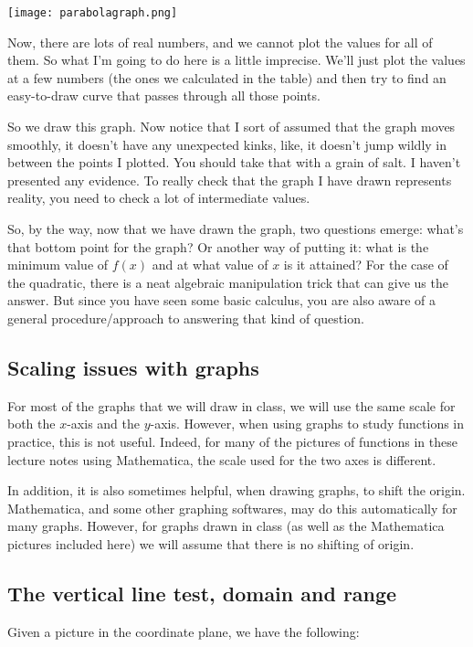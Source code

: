 \documentclass{amsart}
\begin{document}
\texttt{[image: parabolagraph.png]}

Now, there are lots of real numbers, and we cannot plot the values for
all of them. So what I'm going to do here is a little imprecise. We'll
just plot the values at a few numbers (the ones we calculated in the
table) and then try to find an easy-to-draw curve that passes through
all those points. 

So we draw this graph. Now notice that I sort of assumed that the
graph moves smoothly, it doesn't have any unexpected kinks, like, it
doesn't jump wildly in between the points I plotted. You should take
that with a grain of salt. I haven't presented any evidence. To really
check that the graph I have drawn represents reality, you need to
check a lot of intermediate values.

So, by the way, now that we have drawn the graph, two questions
emerge: what's that bottom point for the graph? Or another way of
putting it: what is the minimum value of $f(x)$ and at what value of
$x$ is it attained? For the case of the quadratic, there is a neat
algebraic manipulation trick that can give us the answer. But since
you have seen some basic calculus, you are also aware of a general
procedure/approach to answering that kind of question.

\subsection*{Scaling issues with graphs}

For most of the graphs that we will draw in class, we will use the
same scale for both the $x$-axis and the $y$-axis. However, when using
graphs to study functions in practice, this is not useful. Indeed, for
many of the pictures of functions in these lecture notes using
Mathematica, the scale used for the two axes is different.

In addition, it is also sometimes helpful, when drawing graphs, to
shift the origin. Mathematica, and some other graphing softwares, may
do this automatically for many graphs. However, for graphs drawn in
class (as well as the Mathematica pictures included here) we will
assume that there is no shifting of origin.

\subsection{The vertical line test, domain and range}

Given a picture in the coordinate plane, we have the following:
\end{document}

